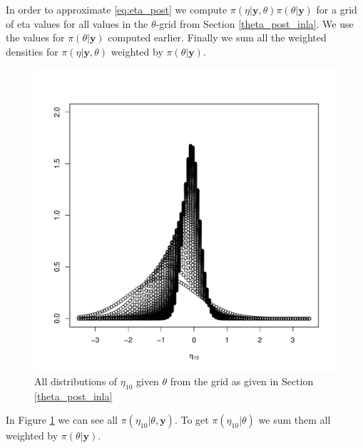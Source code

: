 In order to approximate \eqref{eq:eta_post} we compute $\pi(\eta|\boldsymbol{y}, \theta) \pi(\theta|\boldsymbol{y})$ for a grid of eta values for all values in the $\theta$-grid from Section \ref{theta_post_inla}. We use the values for $\pi(\theta|\boldsymbol{y})$ computed earlier. Finally we sum all the weighted densities for $\pi(\eta|\boldsymbol{y}, \theta)$ weighted by $\pi(\theta|\boldsymbol{y})$.







\begin{figure}[H]
    \centering
    \includegraphics[width=\textwidth]{Images/eta_10.pdf}
    \caption{All distributions of $\eta_{10}$ given $\theta$ from the grid as given in Section \ref{theta_post_inla}}
    \label{fig:eta_all}
\end{figure}


In Figure \ref{fig:eta_all} we can see all $\pi(\eta_{10}|\theta, \boldsymbol{y})$. To get  $\pi(\eta_{10}|\theta)$ we sum them all weighted by $\pi(\theta|\boldsymbol{y})$. 

